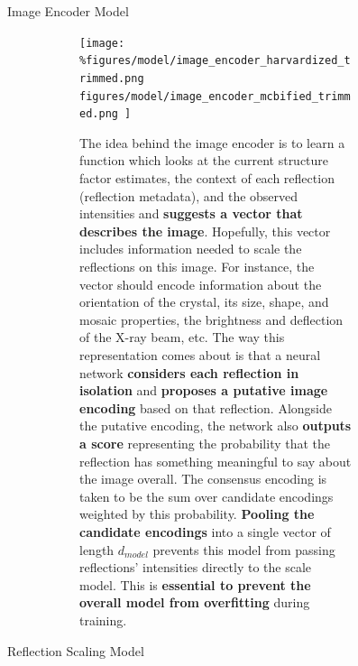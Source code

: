 \documentclass[final]{beamer}
\newlength{\sepwidth}
\newlength{\colwidth}
\newcommand{\separatorcolumn}{\begin{column}{\sepwidth}\end{column}}
\begin{document}
\begin{frame}[t]
\begin{columns}[t]
\begin{column}{\colwidth}
\end{column}

\separatorcolumn

\begin{column}{\colwidth}

  \begin{block}{Image Encoder Model}
    \begin{figure}
        \begin{subfigure}[c]{0.45\textwidth}
            \centering
            \texttt{[image: 
                \%figures/model/image\_encoder\_harvardized\_trimmed.png
                figures/model/image\_encoder\_mcbified\_trimmed.png
            ]}
        \end{subfigure}
        \begin{subfigure}[c]{0.5\textwidth}
            The idea behind the image encoder is to learn a function which looks at the current structure factor estimates, the context of each reflection (reflection metadata), and the observed intensities and \textbf{suggests a vector that describes the image}. Hopefully, this vector includes information needed to scale the reflections on this image. For instance, the vector should encode information about the orientation of the crystal, its size, shape, and mosaic properties, the brightness and deflection of the X-ray beam, etc. The way this representation comes about is that a neural network \textbf{considers each reflection in isolation} and \textbf{proposes a putative image encoding} based on that reflection. Alongside the putative encoding, the network also \textbf{outputs a score} representing the probability that the reflection has something meaningful to say about the image overall. The consensus encoding is taken to be the sum over candidate encodings weighted by this probability. \textbf{Pooling the candidate encodings} into a single vector of length $d_{model}$ prevents this model from passing reflections' intensities directly to the scale model. This is \textbf{essential to prevent the overall model from overfitting} during training. 
        \end{subfigure}
    \end{figure}
  \end{block}
  \begin{block}{Reflection Scaling Model}
    \begin{figure}
        \begin{subfigure}[c]{0.5\textwidth}

\end{subfigure}
\end{figure}
\end{block}
\end{column}
\end{columns}
\end{frame}
\end{document}
